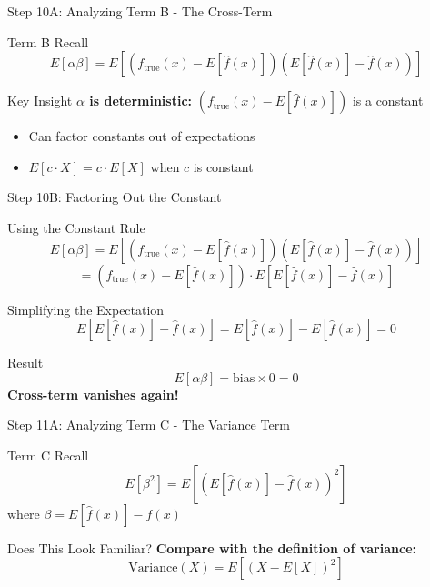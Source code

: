 \documentclass[10pt]{beamer}
\begin{document}
\begin{frame}{Step 10A: Analyzing Term B - The Cross-Term}
\begin{definitionbox}{Term B Recall}
$$E[\alpha\beta] = E[(f_{\text{true}}(x) - E[\hat{f}(x)])(E[\hat{f}(x)] - \hat{f}(x))]$$
\end{definitionbox}

\begin{keypointsbox}{Key Insight}
\textbf{$\alpha$ is deterministic:} $(f_{\text{true}}(x) - E[\hat{f}(x)])$ is a constant
\begin{itemize}
\item Can factor constants out of expectations
\item $E[c \cdot X] = c \cdot E[X]$ when $c$ is constant
\end{itemize}
\end{keypointsbox}
\end{frame}

\begin{frame}{Step 10B: Factoring Out the Constant}
\begin{examplebox}{Using the Constant Rule}
$$E[\alpha\beta] = E[(f_{\text{true}}(x) - E[\hat{f}(x)])(E[\hat{f}(x)] - \hat{f}(x))]$$
$$= (f_{\text{true}}(x) - E[\hat{f}(x)]) \cdot E[E[\hat{f}(x)] - \hat{f}(x)]$$
\end{examplebox}

\begin{keypointsbox}{Simplifying the Expectation}
$$E[E[\hat{f}(x)] - \hat{f}(x)] = E[\hat{f}(x)] - E[\hat{f}(x)] = 0$$
\end{keypointsbox}

\begin{alertbox}{Result}
$$\boxed{E[\alpha\beta] = \text{bias} \times 0 = 0}$$
\textbf{Cross-term vanishes again!}
\end{alertbox}
\end{frame}

\begin{frame}{Step 11A: Analyzing Term C - The Variance Term}
\begin{definitionbox}{Term C Recall}
$$E[\beta^2] = E[(E[\hat{f}(x)] - \hat{f}(x))^2]$$
where $\beta = E[\hat{f}(x)] - \hat{f}(x)$
\end{definitionbox}

\begin{keypointsbox}{Does This Look Familiar?}
\textbf{Compare with the definition of variance:}
$$\text{Variance}(X) = E[(X - E[X])^2]$$
\end{keypointsbox}
\end{frame}
\end{document}
